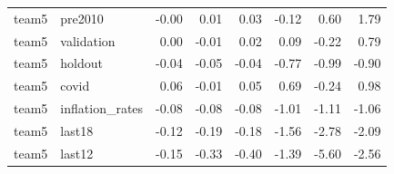 \begin{table}
\begin{tabular}{llrrrrrr}
team5 & pre2010 & -0.00 & 0.01 & 0.03 & -0.12 & 0.60 & 1.79 \\
team5 & validation & 0.00 & -0.01 & 0.02 & 0.09 & -0.22 & 0.79 \\
team5 & holdout & -0.04 & -0.05 & -0.04 & -0.77 & -0.99 & -0.90 \\
team5 & covid & 0.06 & -0.01 & 0.05 & 0.69 & -0.24 & 0.98 \\
team5 & inflation\_rates & -0.08 & -0.08 & -0.08 & -1.01 & -1.11 & -1.06 \\
team5 & last18 & -0.12 & -0.19 & -0.18 & -1.56 & -2.78 & -2.09 \\
team5 & last12 & -0.15 & -0.33 & -0.40 & -1.39 & -5.60 & -2.56 \\
\bottomrule
\end{tabular}
\end{table}
